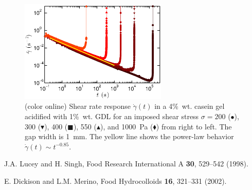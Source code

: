 \documentclass[twocolumn,superscriptaddress,showpacs,preprintnumbers,amsmath,amssymb,prl]{revtex4}
\newcommand\gp{\dot\gamma}
\begin{document}
\begin{figure}[h]
\centering
\includegraphics[width=7cm,clip]{SuppFig2.eps}
\caption{(color online) Shear rate response $\gp(t)$ in a 4\%~wt. casein gel acidified with 1\%~wt. GDL for an imposed shear stress $\sigma=200$ ($\bullet$), 300 ($\blacktriangledown$), 400 ($\blacksquare$), 550 ($\blacktriangle$), and 1000~Pa ($\blacklozenge$) from right to left. The gap width is 1~mm. The yellow line shows the power-law behavior $\gp(t)\sim t^{-0.85}$.
\label{suppfig2}}
\end{figure} 

\begin{thebibliography}{}

 J.A. Lucey and H. Singh, Food Research International A {\bf 30}, 529--542 (1998).

 E. Dickison and L.M. Merino, Food Hydrocolloids {\bf 16}, 321--331 (2002).

\end{thebibliography}
\end{document}

